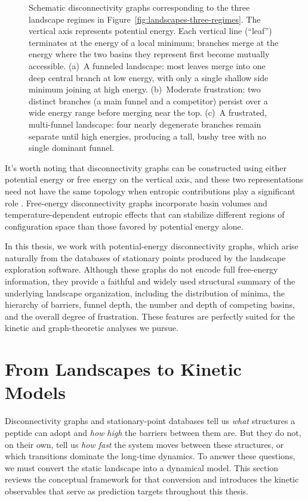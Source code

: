 \begin{figure}[t]
\begin{tikzpicture}
  \end{tikzpicture}
  \caption{Schematic disconnectivity graphs corresponding to the three landscape
  regimes in Figure~\ref{fig:landscapes-three-regimes}. The vertical axis
  represents potential energy. Each vertical line (``leaf'') terminates at the
  energy of a local minimum; branches merge at the energy where the two basins
  they represent first become mutually accessible.
  (a)~A funneled landscape: most leaves merge into one deep central branch at
  low energy, with only a single shallow side minimum joining at high energy.
  (b)~Moderate frustration: two distinct branches (a main funnel and a competitor)
  persist over a wide energy range before merging near the top.
  (c)~A frustrated, multi-funnel landscape: four nearly degenerate branches
  remain separate until high energies, producing a tall, bushy tree with no
  single dominant funnel.}
  \label{fig:disconnectivity-schematic}
\end{figure}


It's worth noting that disconnectivity graphs can be constructed using either
potential energy or free energy on the vertical axis, and these two
representations need not have the same topology when entropic contributions
play a significant role \cite{Krivov2002FEDG,Wales2006PELvsFEL}. Free-energy
disconnectivity graphs incorporate basin volumes and temperature-dependent
entropic effects that can stabilize different regions of configuration space
than those favored by potential energy alone.

In this thesis, we work with
potential-energy disconnectivity graphs, which arise naturally from the
databases of stationary points produced by the landscape exploration software.
Although these graphs do not encode full free-energy information, they provide
a faithful and widely used structural summary of the underlying landscape organization,
including the distribution of minima, the hierarchy of barriers, funnel depth, the number and depth of competing basins, and the overall degree of frustration. These features are perfectly suited for the kinetic and
graph-theoretic analyses we pursue.


\section{From Landscapes to Kinetic Models}\label{sec:ktn}

Disconnectivity graphs and stationary-point databases tell us \emph{what} structures a peptide can adopt and \emph{how high} the barriers between them are. But they do not, on their own, tell us \emph{how fast} the system moves between these structures, or which transitions dominate the long-time dynamics. To answer these questions, we must convert the static landscape into a dynamical model. This section reviews the conceptual framework for that conversion and introduces the kinetic observables that serve as prediction targets throughout this thesis.

